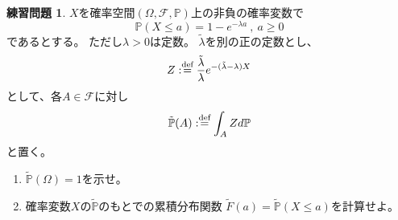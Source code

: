 \documentclass[uplatex]{jsarticle}
\theoremstyle{definition}
\newtheorem{prob}[prob]{練習問題}
\def\P{\mathbb{P}}
\def\mcF{\mathcal{F}}
\def\dfn{:\overset{\mbox{{\scriptsize def}}}{=}}
\begin{document}
\begin{prob}\label{prob: 1.14}
  \(X\)を確率空間\((\Omega,\mcF,\P)\)上の非負の確率変数で
  \[
  \P(X\leq a) = 1-e^{-\lambda a} \ , \ a \geq 0
  \]
  であるとする。
  ただし\(\lambda > 0\)は定数。
  \(\tilde{\lambda}\)を別の正の定数とし、
  \[
  Z\dfn \frac{\tilde{\lambda}}{\lambda}e^{-(\tilde{\lambda}-\lambda)X}
  \]
  として、各\(A\in \mcF\)に対し
  \[
  \tilde{\P}(A) \dfn \int_AZd\P
  \]
  と置く。
  \begin{enumerate}
    \item \label{enumi: 1.14-1}
    \(\tilde{\P}(\Omega)=1\)を示せ。
    \item \label{enumi: 1.14-2}
    確率変数\(X\)の\(\tilde{\P}\)のもとでの累積分布関数
    \(\tilde{F}(a) = \tilde{\P}(X \leq a)\)を計算せよ。
  \end{enumerate}
\end{prob}
\end{document}
